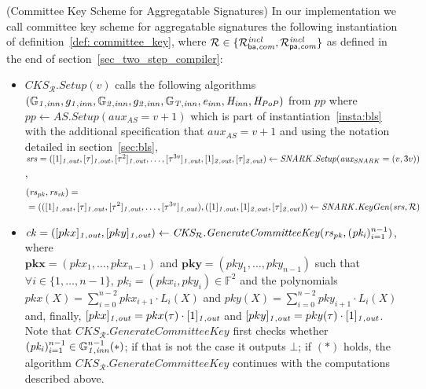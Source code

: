 \begin{construction}(Committee Key Scheme for Aggregatable Signatures)
\label{inst:cks} In our implementation we call committee key scheme for 
aggregatable signatures the following instantiation of definition~\ref{def: committee_key}, where $\mathcal{R} \in \{\mathcal{R}^{\mathit{incl}}_{\mathsf{ba},\mathit{com}}, \mathcal{R}^{\mathit{incl}}_{\mathsf{pa},\mathit{com}}\}$ 
as defined in the end of section~\ref{sec_two_step_compiler}:
\begin{itemize}
\item $\mathit{CKS_{\mathcal{R}}.Setup}(v)$ calls the following algorithms \\
$(\mathbb{G}_{\mathit{1,inn}}, g_{\mathit{1,inn}}, \mathbb{G}_{\mathit{2,inn}}, g_{\mathit{2,inn}}, \mathbb{G}_{\mathit{T,inn}}, \mathit{e}_{\mathit{inn}}, \mathit{H}_{\mathit{inn}}, \mathit{H}_{\mathit{PoP}})$ from $\mathit{pp}$ where $\mathit{pp} \leftarrow \mathit{AS.Setup}(\mathit{aux_{\mathit{AS}}}= v+1)$ 
which is part of instantiation~\ref{insta:bls} with the additional specification that $\mathit{aux_{\mathit{AS}}} = v+1$ and using the notation detailed in section~\ref{sec:bls}, \\
$\mathit{srs}=([1]_{\mathit{1,out}}, [\tau]_{\mathit{1,out}}, [\tau^2]_{\mathit{1,out}}, \ldots, [\tau^{3v}]_{\mathit{1,out}}, [1]_{\mathit{2,out}}, [\tau]_{\mathit{2,out}}) \leftarrow \mathit{SNARK.Setup}(\mathit{aux_{\mathit{SNARK}}} = (v, 3v))$, 
\vspace{-0.20cm}
\begin{align*}
&(\mathit{rs}_{\mathit{pk}}, \mathit{rs}_{\mathit{vk}}) = \\
& = (([1]_{\mathit{1,out}}, [\tau]_{\mathit{1,out}}, [\tau^2]_{\mathit{1,out}}, \ldots, [\tau^{3v}]_{\mathit{1,out}}), 
([1]_{\mathit{1,out}}, [1]_{\mathit{2,out}}, [\tau]_{\mathit{2,out}})) \leftarrow \mathit{SNARK.KeyGen}(\mathit{srs}, \mathcal{R})
\end{align*}

\item $\mathit{ck} = ([pkx]_{\mathit{1,out}}, [pky]_{\mathit{1,out}}) \leftarrow \mathit{CKS_{\mathcal{R}}.GenerateCommitteeKey}(\mathit{rs_{pk}}, (\mathit{pk_i})_{i=1}^{n-1})$, 
where \\ $\mathbf{pkx} = (\mathit{pkx_{1}}, \ldots, \mathit{pkx_{n-1}})$ and $\mathbf{pky} = (\mathit{pky_{1}}, \ldots, \mathit{pky_{n-1}})$ 
such that $\forall i \in \{1, \ldots, n-1\}$, $\mathit{pk_i} = (\mathit{pkx_i}, \mathit{pky_i}) \in \mathbb{F}^{2}$ and 
the polynomials $pkx(X) = \sum_{i=0}^{n-2} \mathit{pkx_{i+1}} \cdot L_i(X)$ and $pky(X) = \sum_{i=0}^{n-2} \mathit{pky_{i+1}} \cdot L_i(X)$ and, finally,  
$[pkx]_{\mathit{1,out}} = pkx(\tau) \cdot [1]_{\mathit{1,out}}$ and $[pky]_{\mathit{1,out}} = pky(\tau) \cdot [1]_{\mathit{1,out}}$. Note that 
$\mathit{CKS_{\mathcal{R}}.GenerateCommitteeKey}$ first checks whether $(\mathit{pk_i})_{i=1}^{n-1} \in \mathbb{G}_{\mathit{1,inn}}^{n-1} (\ast) $; if that is not the case it outputs 
$\bot$; if $(\ast)$ holds, the algorithm $\mathit{CKS_{\mathcal{R}}.GenerateCommitteeKey}$ continues with the computations described above. 


\end{itemize}
\end{construction}
